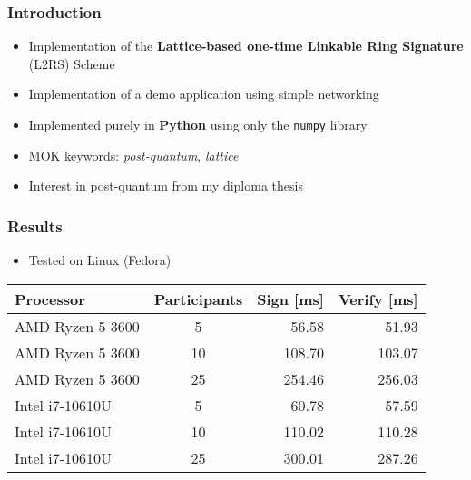 \documentclass[%
  14pt,       				%
	t,                  %
	aspectratio=1610,   %
	unicode,						%
]{beamer}				    	%
\begin{document}
\disablenavigationsymbols

\maketitle


\begin{frame}[c]
	\frametitle{Introduction}
	\large{
		\begin{itemize}
			\item Implementation of the \textbf{Lattice-based one-time Linkable Ring Signature} (L2RS) Scheme
			\item Implementation of a demo application using simple networking
			\item Implemented purely in \textbf{Python} using only the \texttt{numpy} library
			\item MOK keywords: \textit{post-quantum}, \textit{lattice}
			\item Interest in post-quantum from my diploma thesis
		\end{itemize}
	}
\end{frame}

\begin{frame}[c]
	\frametitle{Results}
	\large{
		\begin{itemize}
			\item Tested on Linux (Fedora)
		\end{itemize}
	}
	\begin{table}[htbp]
		\centering
		\begin{tabular}{|l|c|r|r|}
			\hline
			Processor        & Participants & Sign [ms] & Verify [ms] \\
			\hline
			AMD Ryzen 5 3600 & 5            & 56.58     & 51.93       \\
			AMD Ryzen 5 3600 & 10           & 108.70    & 103.07      \\
			AMD Ryzen 5 3600 & 25           & 254.46    & 256.03      \\
			Intel i7-10610U  & 5            & 60.78     & 57.59       \\
			Intel i7-10610U  & 10           & 110.02    & 110.28      \\
			Intel i7-10610U  & 25           & 300.01    & 287.26      \\
			\hline
		\end{tabular}
	\end{table}
\end{frame}
\end{document}
